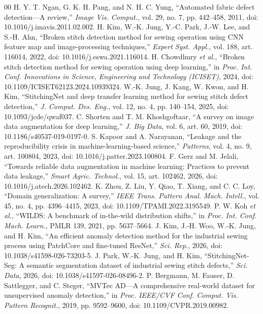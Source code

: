 \documentclass[conference,a4paper]{IEEEtran}
\begin{document}
\begin{thebibliography}{00}\footnotesize
{} H. Y. T. Ngan, G. K. H. Pang, and N. H. C. Yung, ``Automated fabric defect detection---A review,'' \emph{Image Vis. Comput.}, vol. 29, no. 7, pp. 442--458, 2011, doi: 10.1016/j.imavis.2011.02.002.
 H. Kim, W.-K. Jung, Y.-C. Park, J.-W. Lee, and S.-H. Ahn, ``Broken stitch detection method for sewing operation using CNN feature map and image-processing techniques,'' \emph{Expert Syst. Appl.}, vol. 188, art. 116014, 2022, doi: 10.1016/j.eswa.2021.116014.
 H. Chowdhury \emph{et al.}, ``Broken stitch detection method for sewing operation using deep learning,'' in \emph{Proc. Int. Conf. Innovations in Science, Engineering and Technology (ICISET)}, 2024, doi: 10.1109/ICISET62123.2024.10939324.
 W.-K. Jung, J. Kang, W. Kwon, and H. Kim, ``StitchingNet and deep transfer learning method for sewing stitch defect detection,'' \emph{J. Comput. Des. Eng.}, vol. 12, no. 4, pp. 140--154, 2025, doi: 10.1093/jcde/qwaf037.
 C. Shorten and T. M. Khoshgoftaar, ``A survey on image data augmentation for deep learning,'' \emph{J. Big Data}, vol. 6, art. 60, 2019, doi: 10.1186/s40537-019-0197-0.
 S. Kapoor and A. Narayanan, ``Leakage and the reproducibility crisis in machine-learning-based science,'' \emph{Patterns}, vol. 4, no. 9, art. 100804, 2023, doi: 10.1016/j.patter.2023.100804.
 F. Gerz and M. Jelali, ``Towards reliable data augmentation in machine learning: Practices to prevent data leakage,'' \emph{Smart Agric. Technol.}, vol. 15, art. 102462, 2026, doi: 10.1016/j.atech.2026.102462.
 K. Zhou, Z. Liu, Y. Qiao, T. Xiang, and C. C. Loy, ``Domain generalization: A survey,'' \emph{IEEE Trans. Pattern Anal. Mach. Intell.}, vol. 45, no. 4, pp. 4396--4415, 2023, doi: 10.1109/TPAMI.2022.3195549.
 P. W. Koh \emph{et al.}, ``WILDS: A benchmark of in-the-wild distribution shifts,'' in \emph{Proc. Int. Conf. Mach. Learn.}, PMLR 139, 2021, pp. 5637--5664.
 J. Kim, J.-H. Woo, W.-K. Jung, and H. Kim, ``An efficient anomaly detection method for the industrial sewing process using PatchCore and fine-tuned ResNet,'' \emph{Sci. Rep.}, 2026, doi: 10.1038/s41598-026-73203-5.
 J. Park, W.-K. Jung, and H. Kim, ``StitchingNet-Seg: A semantic segmentation dataset of industrial sewing stitch defects,'' \emph{Sci. Data}, 2026, doi: 10.1038/s41597-026-08496-2.
 P. Bergmann, M. Fauser, D. Sattlegger, and C. Steger, ``MVTec AD---A comprehensive real-world dataset for unsupervised anomaly detection,'' in \emph{Proc. IEEE/CVF Conf. Comput. Vis. Pattern Recognit.}, 2019, pp. 9592--9600, doi: 10.1109/CVPR.2019.00982.

\end{thebibliography}
\end{document}
